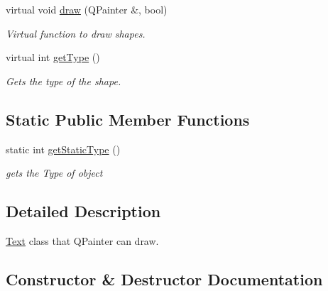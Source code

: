 \begin{DoxyCompactItemize}
virtual void \hyperlink{classText_a54e8085e0b04abba6b4a09232ff21449}{draw} (Q\+Painter \&, bool)
\begin{DoxyCompactList}\small\item\em Virtual function to draw shapes. \end{DoxyCompactList}\item 
virtual int \hyperlink{classText_a701eda01498e972823f4c833ed0e8811}{get\+Type} ()
\begin{DoxyCompactList}\small\item\em Gets the type of the shape. \end{DoxyCompactList}\end{DoxyCompactItemize}
\subsection*{Static Public Member Functions}
\begin{DoxyCompactItemize}
\item 
static int \hyperlink{classText_aa63f66168dc6f0af547710743a52f9c9}{get\+Static\+Type} ()
\begin{DoxyCompactList}\small\item\em gets the Type of object \end{DoxyCompactList}\end{DoxyCompactItemize}


\subsection{Detailed Description}
\hyperlink{classText}{Text} class that Q\+Painter can draw. 

\subsection{Constructor \& Destructor Documentation}
